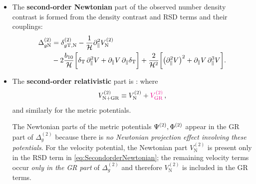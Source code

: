 {{{{\begin{itemize}
\item
The {\bfseries second-order Newtonian} part of the observed number density contrast is formed from the density contrast and RSD terms and their couplings:
\begin{align} 
\Delta^{{{({2})}}}_{g{\mathrm{N}}}
  &= \delta_{g\mathrm{T,N}}^{{{({2})}}} - \frac{1}{\mathcal{H}}\partial_{\parallel}^{2}V^{{{({2})}}}_{\mathrm{N}}
  \notag\\
& - 2\frac{b_{10}}{\mathcal{H}} \bigg[\delta_{\mathrm{T}}\,\partial_{\parallel}^{2}V + \partial_{\parallel}V\,\partial_{\parallel}\delta_{\mathrm{T}}\bigg]
  + \frac{2}{\mathcal{H}^{2}}\bigg[\big(\partial_{\parallel}^{2}V\big)^{2} + \partial_{\parallel}V\,\partial_{\parallel}^{3}V\bigg]. \label{eq:SecondorderNewtonian}
 \end{align}
 
\item
  The {\bfseries second-order relativistic} part is  \cite{Jolicoeur:2017nyt,Jolicoeur:2017eyi}:
where 
\begin{equation}
V_{\mathrm{N+GR}}^{(2)}\equiv V_{\mathrm{N}}^{(2)}+{\color{magenta}{V_{\mathrm{GR}}^{(2)}}}\,, 
\end{equation}
and similarly for the metric potentials.

The Newtonian parts of the metric potentials $\Psi^{{(2)}}, \Phi^{{(2)}}$ appear in the GR part of $\Delta_{g}^{(2)}$ because there is {\em no Newtonian projection effect involving these potentials}. For the velocity potential, the Newtonian part $V^{(2)}_{\mathrm{N}}$ is present only in the RSD term in \eqref{eq:SecondorderNewtonian}; the remaining velocity terms occur {\em only in the GR part} of $\Delta_{g}^{(2)}$ and therefore   $V^{(2)}_{\mathrm{N}}$ is included in the GR terms.


\end{itemize}}}}}

